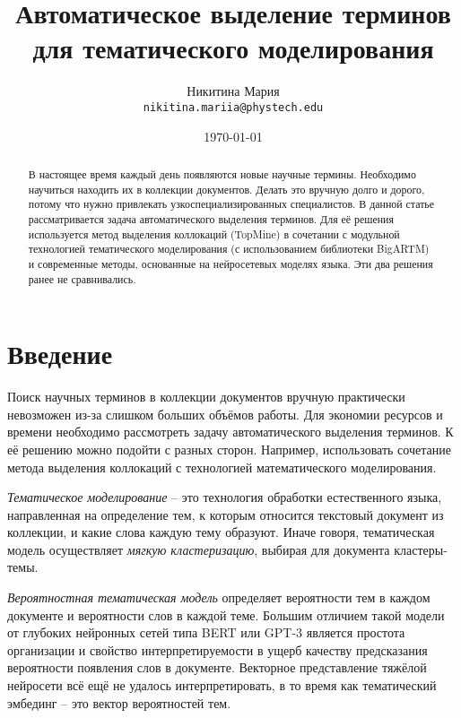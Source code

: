 \documentclass[a4paper, 12pt]{article}
\title{Автоматическое выделение терминов для тематического моделирования}
\author{
	  Никитина Мария \\
	\texttt{nikitina.mariia@phystech.edu} \\
}
\date{\today}
\begin{document}
\maketitle

\begin{abstract}
В настоящее время каждый день появляются новые научные термины. Необходимо научиться находить их в коллекции документов. Делать это вручную долго и дорого, потому что нужно привлекать узкоспециализированных специалистов. В данной статье рассматривается задача автоматического выделения терминов. Для её решения используется метод выделения коллокаций (TopMine) в сочетании с модульной технологией тематического моделирования (с использованием библиотеки BigARTM) и современные методы, основанные на нейросетевых моделях языка. Эти два решения ранее не сравнивались.
\end{abstract}


\section{Введение}

        Поиск научных терминов в коллекции документов вручную практически невозможен из-за слишком больших объёмов работы. Для экономии ресурсов и времени необходимо рассмотреть задачу автоматического выделения терминов. К её решению можно подойти с разных сторон. Например, использовать сочетание метода выделения коллокаций с технологией математического моделирования.

        \textit{Тематическое моделирование} -- это технология обработки естественного языка, направленная на определение тем, к которым относится текстовый документ из коллекции, и какие слова каждую тему образуют. Иначе говоря, тематическая модель осуществляет \textit{мягкую кластеризацию}, выбирая для документа кластеры-темы.

        \textit{Вероятностная тематическая модель} определяет вероятности тем в каждом документе и вероятности слов в каждой теме. Большим отличием такой модели от глубоких нейронных сетей типа BERT \citep{bert} или GPT-3 \citep{Brown2020LanguageMA} является простота организации и свойство интерпретируемости в ущерб качеству предсказания вероятности появления слов в документе. Векторное представление тяжёлой нейросети всё ещё не удалось интерпретировать, в то время как тематический эмбединг -- это вектор вероятностей тем.
\end{document}
